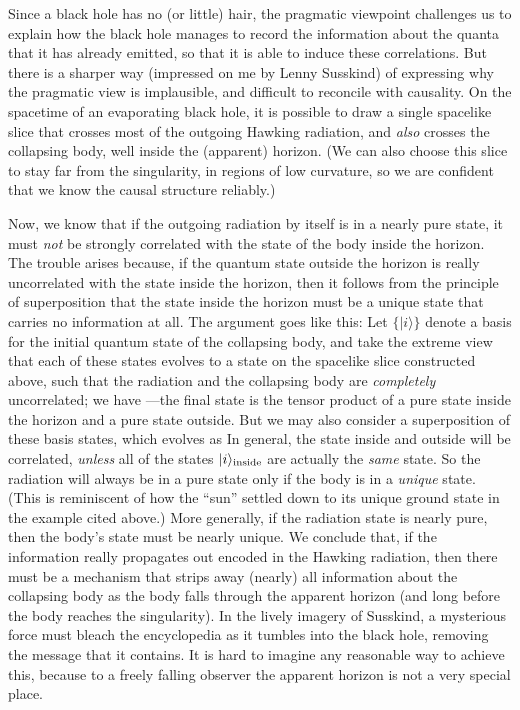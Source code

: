 Since a black hole has no (or little) hair, the pragmatic viewpoint challenges
us to
explain how the black hole manages to record the information about the quanta
that it has already emitted, so that it is able to induce these correlations.
But there is a sharper way (impressed on me by Lenny Susskind) of expressing
why the pragmatic view is implausible, and difficult to reconcile with
causality\lref{}\lref{}.  On the spacetime of
an evaporating black hole, it is possible to
draw a single spacelike slice that crosses most of the outgoing Hawking
radiation, and {\it also} crosses the collapsing body, well inside the
(apparent) horizon.  (We can also choose this slice to stay far from the
singularity, in regions of low curvature, so we are confident that we know the
causal structure reliably.)

\def\ket#1{|#1\rangle}
Now, we know that if the outgoing radiation by itself is in a nearly pure
state, it must {\it not} be strongly correlated with the state of the body
inside the horizon.  The trouble arises because, if the quantum state outside
the horizon is really uncorrelated with the state inside the horizon, then it
follows from the principle of superposition that the state inside the horizon
must be a unique state that carries no information at all.  The argument goes
like this:  Let $\{\ket{i}\}$ denote a basis for the initial quantum state of
the collapsing body, and take the extreme view that each of these states
evolves to a state on the  spacelike slice constructed above, such that the
radiation and the collapsing body are {\it completely} uncorrelated; we have
\eqn\ia{\ket{i}\longrightarrow\ket{i}_{\rm inside}\otimes\ket{i}_{\rm outside}}
%
---the final state is the tensor product of a pure state inside the horizon and
a pure state outside.  But we may also consider a superposition of these basis
states, which evolves as
\eqn\ib{\sum_i c_i\ket{i}\longrightarrow\sum_i c_i\left(\ket{i}_{\rm
inside}\otimes\ket{i}_{\rm outside}\right).}
%
In general, the state inside and outside will be correlated, {\it unless} all
of the states $\ket{i}_{\rm inside}$ are actually the {\it same} state.  So the
radiation will always be in a pure state only if the body is in a {\it unique}
state.
(This is reminiscent of how the ``sun'' settled down to its unique ground state
in the example cited above.)
More generally, if the radiation state is nearly pure, then the body's state
must be nearly unique.
We conclude that, if the information really
propagates out encoded in the Hawking radiation, then there must be a mechanism
that strips away (nearly) all information about the collapsing body as the body
falls through the apparent horizon (and long before the body reaches the
singularity).  In the lively imagery of Susskind\susskind, a mysterious force
must bleach the encyclopedia as it tumbles into the black hole, removing the
message that it contains.  It is hard to imagine any reasonable way to achieve
this,
because to a freely falling observer the apparent horizon is not a very special
place.

